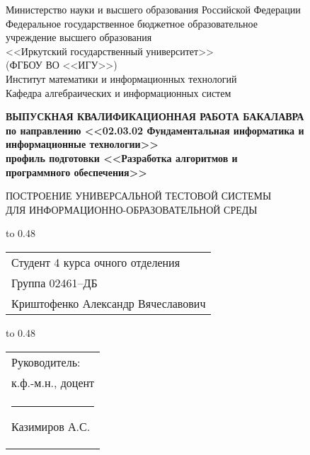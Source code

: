 \thispagestyle{empty}
\begin{center}
Министерство науки и высшего образования Российской Федерации\\
Федеральное государственное бюджетное образовательное\\
учреждение высшего образования\\
<<Иркутский государственный университет>>\\
(ФГБОУ ВО <<ИГУ>>)\\
Институт математики и информационных технологий\\
Кафедра алгебраических и информационных систем\\
\end{center}

\vspace{2.7cm}

\begin{center}
{\bf 
ВЫПУСКНАЯ КВАЛИФИКАЦИОННАЯ РАБОТА
БАКАЛАВРА\\[1mm]
по направлению <<02.03.02 Фундаментальная информатика и \\[1mm]
информационные технологии>>\\[1mm]
профиль подготовки <<Разработка алгоритмов и\\программного обеспечения>>
}  

\vspace{0.9cm}

{
ПОСТРОЕНИЕ УНИВЕРСАЛЬНОЙ 
ТЕСТОВОЙ СИСТЕМЫ\\[1mm]
ДЛЯ ИНФОРМАЦИОННО-ОБРАЗОВАТЕЛЬНОЙ СРЕДЫ 
} %
\end{center}

\vspace{1.8cm}

{
\noindent\hbox to 0.48\textwidth {%
	\mbox{ } \hfil} %
	\begin{tabular}[t]{l}
		Студент 4 курса очного отделения\\
		Группа 02461--ДБ\\
		Криштофенко Александр 
		Вячеславович		
	\end{tabular}		
}

\vspace{0.8cm}

{
\noindent\hbox to 0.48\textwidth {%
	\mbox{ } \hfil} %
	\begin{tabular}[t]{l}
		Руководитель:\\ к.ф.-м.н., доцент\\
		\rule{2.7cm}{0.5pt} Казимиров А.С.		
	\end{tabular}		
}

